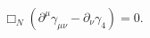 \begin{equation}
 \Box_N( \partial^\mu \gamma_{ \mu \nu}-\partial_{\nu} \gamma_4)=0.
\end{equation}

